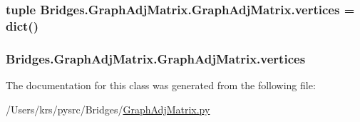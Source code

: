 \subsubsection[{vertices}]{\setlength{\rightskip}{0pt plus 5cm}tuple Bridges.\+Graph\+Adj\+Matrix.\+Graph\+Adj\+Matrix.\+vertices = dict()\hspace{0.3cm}{\ttfamily [static]}}\label{class_bridges_1_1_graph_adj_matrix_1_1_graph_adj_matrix_afbda1832dbd6451a84f14b0a9f9d40c2}
\hypertarget{class_bridges_1_1_graph_adj_matrix_1_1_graph_adj_matrix_a05162a3310d30fe9ee83c8d708ebff53}{}
\subsubsection[{vertices}]{\setlength{\rightskip}{0pt plus 5cm}Bridges.\+Graph\+Adj\+Matrix.\+Graph\+Adj\+Matrix.\+vertices}\label{class_bridges_1_1_graph_adj_matrix_1_1_graph_adj_matrix_a05162a3310d30fe9ee83c8d708ebff53}


The documentation for this class was generated from the following file\+:\begin{DoxyCompactItemize}
\item 
/\+Users/krs/pysrc/\+Bridges/\hyperlink{_graph_adj_matrix_8py}{Graph\+Adj\+Matrix.\+py}\end{DoxyCompactItemize}
